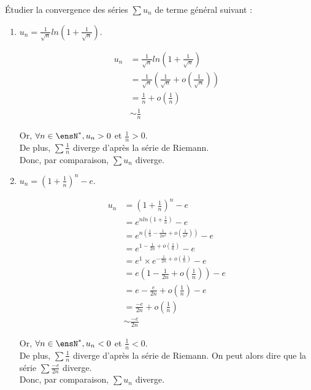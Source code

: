 \noindent Étudier la convergence des séries $\sum u_n$ de terme général suivant :

\begin{enumerate}
    \item $\displaystyle u_n = \frac{1}{\sqrt{n}} ln(1 + \frac{1}{\sqrt{n}})$.

    \exobox
    {
        \begin{align*}
            u_n &= \frac{1}{\sqrt{n}} ln(1 + \frac{1}{\sqrt{n}}) \\
            &= \frac{1}{\sqrt{n}} (\frac{1}{\sqrt{n}} + o(\frac{1}{\sqrt{n}})) \\
            &= \frac{1}{n} + o(\frac{1}{n}) \\
            &\sim \frac{1}{n}
        \end{align*}
    
        Or, $\forall n \in \ensN^*, u_n > 0$ et $\frac{1}{n} > 0$. \\
        De plus, $\sum \frac{1}{n}$ diverge d'après la série de Riemann. \\
        Donc, par comparaison, $\sum u_n$ diverge.
    }

    \vspace{10px}
    
    \item $\displaystyle u_n = (1 + \frac{1}{n})^n - e$.

    \exobox
    {
        \begin{align*}
            u_n &= (1 + \frac{1}{n})^n - e \\
            &= e^{nln(1 + \frac{1}{n})} - e \\
            &= e^{n(\frac{1}{n} - \frac{1}{2n^2} + o(\frac{1}{n^2}))} - e \\
            &= e^{1 - \frac{1}{2n} + o(\frac{1}{n})} - e \\
            &= e^1 \times e^{- \frac{1}{2n} + o(\frac{1}{n})} - e \\
            &= e(1 - \frac{1}{2n} + o(\frac{1}{n})) - e \\
            &= e - \frac{e}{2n} + o(\frac{1}{n}) - e \\
            &= \frac{-e}{2n} + o(\frac{1}{n}) \\
            &\sim \frac{-e}{2n}
        \end{align*}

        Or, $\forall n \in \ensN^*, u_n < 0$ et $\frac{1}{n} < 0$. \\
        De plus, $\sum \frac{1}{n}$ diverge d'après la série de Riemann. On peut alors dire que la série $\sum \frac{-e}{2n}$ diverge. \\
        Donc, par comparaison, $\sum u_n$ diverge.
    }


\end{enumerate}
